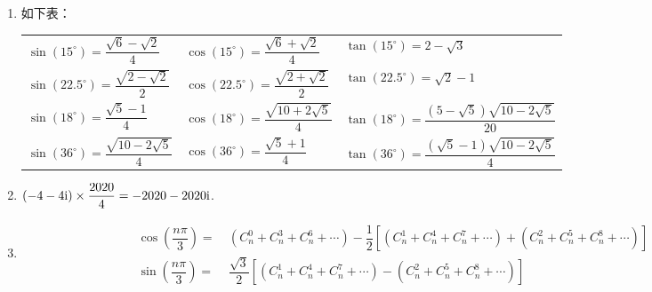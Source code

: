\begin{enumerate}[label={\textbf{\thechapter.\arabic*}},leftmargin=
    \inteval{\myenumleftmargin}pt]
\item 如下表：
\begin{table}[h]
    \centering
    \begin{tabular}{l|l|l}
        $ \sin(15^{\circ})=\dfrac{\sqrt{6}-\sqrt{2}}{4} $ & 
        $ \cos(15^{\circ})=\dfrac{\sqrt{6}+\sqrt{2}}{4} $ & 
        $ \tan(15^{\circ})=2-\sqrt{3}$ \\ [9pt]
        $ \sin(22.5^{\circ})=\dfrac{\sqrt{2-\sqrt{2}}}{2} $ & 
        $\cos(22.5^{\circ})=\dfrac{\sqrt{2+\sqrt{2}}}{2}$ & 
        $ \tan(22.5^{\circ})=\sqrt{2}-1 $ \\ 
        [9pt]		
        $ \sin(18^{\circ})=\dfrac{\sqrt{5}-1}{4} $ & 
        $\cos(18^{\circ})=\dfrac{\sqrt{10+2\sqrt{5}}}{4} $ &
        $ \tan(18^{\circ})=\dfrac{\left(5-\sqrt{5}\right)
            \sqrt{10-2\sqrt{5}}}{20} $ \\ [9pt]	
        $ \sin(36^{\circ})=\dfrac{\sqrt{10-2\sqrt{5}}}{4} $ & $\cos(36^{\circ})=\dfrac{\sqrt{5}+1}{4} $ &
        $ \tan(36^{\circ})=\dfrac{\left(\sqrt{5}-1\right)
            \sqrt{10-2\sqrt{5}}}{4} $ \\ [9pt]
    \end{tabular} 
\end{table}

\item $ (-4-4\mathrm{i})\times \dfrac{2020}{4}=-2020-2020\mathrm{i} $. 

\item 
\begin{align*}
    \cos\left(\dfrac{n\pi}{3}\right) =&\ (C_n^0+C_n^3+C_n^6+\cdots) 
    -\dfrac{1}{2}\left[(C_n^1+C_n^4+C_n^7+\cdots)+
    (C_n^2+C_n^5+C_n^8+\cdots)\right] \\
    \sin\left(\dfrac{n\pi}{3}\right) =&\ 
    \dfrac{\sqrt{3}}{2}\left[(C_n^1+C_n^4+C_n^7+\cdots)-
    (C_n^2+C_n^5+C_n^8+\cdots)\right] 
\end{align*}


\end{enumerate}
